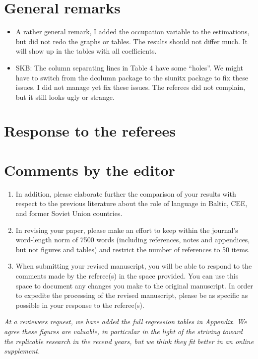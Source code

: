 \documentclass{article}
\newcommand{\debug}[1]{\marginpar{\small\raggedright\begin{spacing}{1}
      \color{BrickRed} #1
\end{spacing}
}}
\newenvironment{response}
{\slshape}{}
\begin{document}
	\section*{General remarks} %
\begin{itemize}
	\item A rather general remark, I added the occupation variable to the estimations, but did not redo the graphs or tables. The results should not differ much. It will show up in the tables with all coefficients.
\item SKB: The column separating lines in Table 4 have some \enquote{holes}. We might have to switch from the dcolumn package to the siunitx package to fix these issues. I did not manage yet fix these issues. The referees did not complain, but it still looks ugly or strange. 
\end{itemize}
\section*{Response to the referees}

\section{Comments by the editor}

\begin{enumerate}
\item In addition, please elaborate further the comparison of your
  results with respect to the previous literature about the role of
  language in Baltic, CEE, and former Soviet Union countries. 
\item 
In revising your paper, please make an effort to keep within the
journal's word-length norm of 7500 words (including references, notes
and appendices, but not figures and tables) and restrict the number of
references to 50 items.

\debug{nothing else but 7500 words/50 items.}
\item When submitting your revised manuscript, you will be able to respond to the comments made by the referee(s) in the space provided.  You can use this space to document any changes you make to the original manuscript.  In order to expedite the processing of the revised manuscript, please be as specific as possible in your response to the referee(s).
\end{enumerate}

\begin{response}
  At a reviewers request, we have added the full regression tables in
  Appendix.  We agree these figures are valuable, in particular in the
  light of the striving toward the replicable research in the recend
  years, but we think they fit better in an online supplement.
\end{response}
\end{document}
